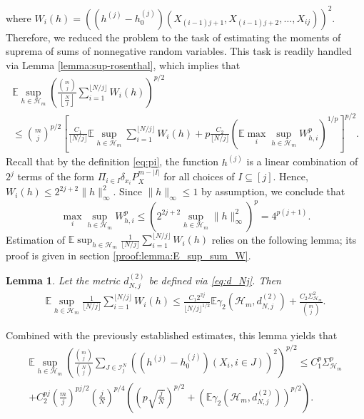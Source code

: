 \documentclass[12pt]{article}
\def\l{\left}
\def\r{\right}
\newcommand{\m}{\mathcal}
\newcommand{\mb}{\mathbb}
\newtheorem{lemma}{Lemma}
\theoremstyle{thmstyletwo}%
\theoremstyle{thmstylethree}%
\begin{document}
    where $W_{i}(h) = \l(\l(h^{(j)} -h_0^{(j)}\r)(X_{(i-1)j + 1}, X_{(i-1)j + 2}, \ldots, X_{ij})\r)^2$. 
    Therefore, we reduced the problem to the task of estimating the moments of suprema of sums of nonnegative random variables. This task is readily handled via Lemma \ref{lemma:sup-rosenthal}, which implies that
    \begin{multline*}
        \mb E \sup_{h \in \mathcal{H}_m} \l(\frac{{m \choose j}}{{\l\lfloor\frac{N}{j}\r\rfloor}}\sum_{i = 1}^{\lfloor N/j\rfloor} W_{i}(h)\r)^{p/2} 
        \\
        \leq {m \choose j}^{p/2}\l[\frac{C_1}{\lfloor N/j\rfloor}\mb E \sup_{h \in \mathcal{H}_m} \sum_{i=1}^{{\lfloor N/j\rfloor}} W_{i}(h) + p\frac{C_2}{\lfloor N/j\rfloor} \l(\mb E \max_i \sup_{h \in \mathcal{H}_m} W^{p}_{h,i}\r)^{1/p}\r]^{p/2}.
    \end{multline*}
    Recall that by the definition \eqref{eq:pi}, the function $h^{(j)}$ is a linear combination of $2^j$ terms of the form $\Pi_{i \in I} \delta_{x_i} P_X^{m - \lvert I \rvert}$ for all choices of $I \subseteq [j]$. Hence, $W_{i}(h) \leq 2^{2j+2}\|h\|^2_\infty$. Since $\|h\|_\infty\leq 1$ by assumption, we conclude that 
    \[
    \max_i \sup_{h \in \mathcal{H}_m} W^{p}_{h,i} \leq  \l(2^{2j+2}\sup_{h \in \mathcal{H}_m} \|h\|^2_\infty\r)^{p} = 4^{p(j+1)}.
    \]
    Estimation of $\mb E \sup_{h \in \mathcal{H}_m} \frac{1}{\lfloor 
 N/j\rfloor}\sum_{i=1}^{\lfloor N/j \rfloor} W_{i}(h)$ relies on the following lemma; its proof is given in section \ref{proof:lemma:E_sup_sum_W}.
    \begin{lemma}
    \label{lemma:E_sup_sum_W}
    Let the metric $d^{(2)}_{N,j}$ be defined via \eqref{eq:d_Nj}. Then
    \begin{align*}
    \mb E \sup_{h \in \mathcal{H}_m} \frac{1}{\lfloor N/j\rfloor}\sum_{i=1}^{\lfloor N/j \rfloor} W_{i}(h) \leq \frac{C_1 2^{2j}}{\lfloor N/j \rfloor^{1/2}} \mb E \gamma_2 (\mathcal{H}_m, d^{(2)}_{N,j}) + \frac{C_2\Sigma^2_{\m H_m}}{{m \choose j}}.
    \end{align*} 
    \end{lemma}
    Combined with the previously established estimates, this lemma yields that 
    \begin{multline}
        \label{eq:h_j_square}
        \mb E \sup_{h \in \mathcal{H}_m} \l(\frac{{m \choose j}}{{N \choose j}} \sum_{J \in \mathcal{I}^N_j} \l(\l(h^{(j)} -h_0^{(j)}\r)\l(X_i, i \in J\r)\r)^2\r)^{p/2} \leq 
        C^{p}_1 \Sigma_{\m H_m}^{p}
        \\
        + C^{pj}_2 \l(\frac{m}{j}\r)^{pj/2}\l(\frac{j}{N}\r)^{p/4} \l( \l(p\sqrt{\frac{j}{N}}\r)^{p/2} + \l(\mb E \gamma_2 (\mathcal{H}_m, d^{(2)}_{N,j})\r)^{p/2}\r).  
    \end{multline}
\end{document}
